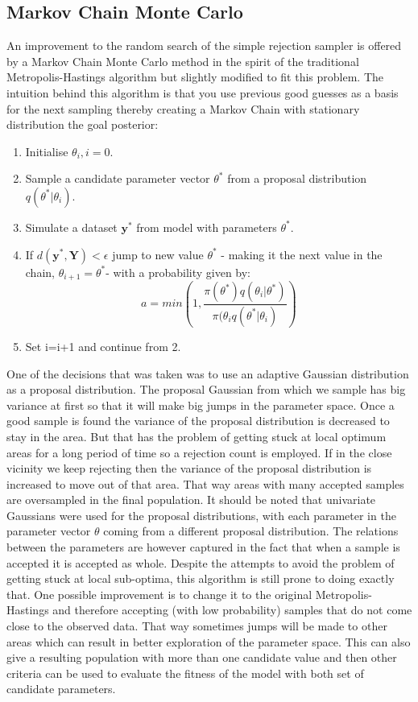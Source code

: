 \documentclass[12pt,a4paper,titlepage]{article}
\begin{document}
\subsection{Markov Chain Monte Carlo}
An improvement to the random search of the simple rejection sampler is offered by a Markov Chain Monte Carlo method in the spirit of the traditional Metropolis-Hastings algorithm but slightly modified to fit this problem\cite{marjoram2003markov}. The intuition behind this algorithm is that you use previous good guesses as a basis for the next sampling thereby creating a Markov Chain with stationary distribution the goal posterior:
\begin{enumerate}[noitemsep]
\item{Initialise $\theta_{i}, i = 0$.}
\item{Sample a candidate parameter vector $\theta^*$ from a proposal distribution $q(\theta^* | \theta_{i})$.}
\item{Simulate a dataset $\mathbf{y}^*$ from model with parameters $\theta^*$.}
\item{If $d(\mathbf{y}^*, \mathbf{Y}) < \epsilon$ jump to new value $\theta^*$ - making it the next value in the chain, $\theta_{i+1} = \theta^*$- with a probability given by:
\begin{equation*}
a = min \left(1, \frac{\pi(\theta^*)q(\theta_{i} | \theta^*)}{\pi(\theta_{i}q(\theta^*|\theta_{i})}\right)
\end{equation*}}
\item{Set i=i+1 and continue from 2.}
\end{enumerate}
One of the decisions that was taken was to use an adaptive Gaussian distribution as a proposal distribution. The proposal Gaussian from which we sample has big variance at first so that it will make big jumps in the parameter space. Once a good sample is found the variance of the proposal distribution is decreased to stay in the area. But that has the problem of getting stuck at local optimum areas for a long period of time so a rejection count is employed. If in the close vicinity we keep rejecting then the variance of the proposal distribution is increased to move out of that area. That way areas with many accepted samples are oversampled in the final population. It should be noted that univariate Gaussians were used for the proposal distributions, with each parameter in the parameter vector $\theta$ coming from a different proposal distribution. The relations between the parameters are however captured in the fact that when a sample is accepted it is accepted as whole. Despite the attempts to avoid the problem of getting stuck at local sub-optima, this algorithm is still prone to doing exactly that. One possible improvement is to change it to the original Metropolis-Hastings and therefore accepting (with low probability) samples that do not come close to the observed data. That way sometimes jumps will be made to other areas which can result in better exploration of the parameter space. This can also give a resulting population with more than one candidate value and then other criteria can be used to evaluate the fitness of the model with both set of candidate parameters. 
\end{document}
